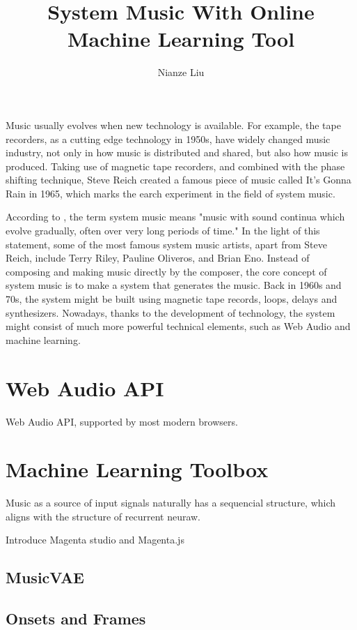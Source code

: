 \documentclass[man]{apa6}
\title{System Music With Online Machine Learning Tool}
\author{Nianze Liu}
\affiliation{New York University}
\begin{document}
\maketitle

Music usually evolves when new technology is available. For example, the tape recorders, as a cutting edge technology in 1950s, have widely changed music industry, not only in how music is distributed and shared, but also how music is produced. Taking use of magnetic tape recorders, and combined with the phase shifting technique, Steve Reich created a famous piece of music called It's Gonna Rain in 1965, which marks the earch experiment in the field of system music. 

According to \textcite{sutherland1994new}, the term system music means "music with sound continua which evolve gradually, often over very long periods of time." In the light of this statement, some of the most famous system music artists, apart from Steve Reich, include Terry Riley, Pauline Oliveros, and Brian Eno. Instead of composing and making music directly by the composer, the core concept of system music is to make a system that generates the music. Back in 1960s and 70s, the system might be built using magnetic tape records, loops, delays and synthesizers. Nowadays, thanks to the development of technology, the system might consist of much more powerful technical elements, such as Web Audio and machine learning.

\section{Web Audio API}

Web Audio API, supported by most modern browsers.

\section{Machine Learning Toolbox}

Music as a source of input signals naturally has a sequencial structure, which aligns with the structure of recurrent neuraw.

Introduce Magenta studio \parencite{magentastudio} and Magenta.js \parencite{magentajs}

\subsection{MusicVAE}
\lipsum[7]

\subsection{Onsets and Frames}
\lipsum[4]
\end{document}
